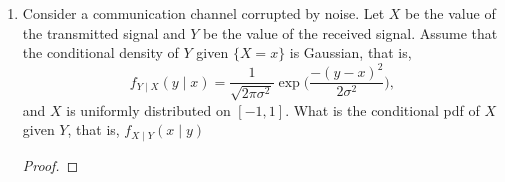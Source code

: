 \documentclass[paper=usletter, fontsize=12pt]{article}
\begin{document}
\begin{enumerate}
\begin{enumerate}
            \item Determine the joint PDF $f_{X,Y}(x,y)$.
            \begin{proof}

                Since
                \begin{align*}
                    \int_{0}^{40}ax\diff{x} & = 1\\
                    a\frac{40^2}{2} & = 1\\
                    \implies a & = \frac{1}{800}
                \end{align*}

            \end{proof}

            \item What is the probability that on a given night Alexei makes a
            positive profit at the casino?
            \begin{proof}
            \end{proof}

            \item Find the PDF of Alexei's profit $Y-X$ on a particular night,
            and also determine its expected value.
            \begin{proof}
            \end{proof}

        \end{enumerate}

        \item Consider a communication channel corrupted by noise. Let $X$ be
        the value of the transmitted signal and $Y$ be the value of the
        received signal. Assume that the conditional density of $Y$ given
        $\{X=x\}$ is Gaussian, that is,
        \begin{equation*}
            f_{Y \mid X}(y \mid x) = \frac{1}{\sqrt{2\pi\sigma^2}}\exp\bigg(\frac{-(y-x)^2}{2\sigma^2}\bigg),
        \end{equation*}
        and $X$ is uniformly distributed on $[-1,1]$. What is the conditional
        pdf of $X$ given $Y$, that is, $f_{X \mid Y}(x \mid y)$
        \begin{proof}
        \end{proof}


\end{enumerate}
\end{document}
